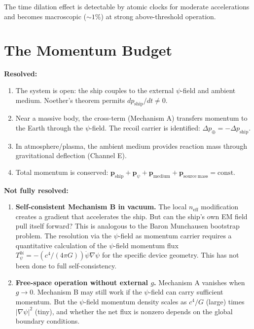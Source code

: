 \documentclass[12pt,aps,prd,superscriptaddress,nofootinbib,longbibliography]{revtex4-2}
\newcommand{\neff}{n_{\mathrm{eff}}}
\begin{document}
The time dilation effect is detectable by atomic clocks for moderate
accelerations and becomes macroscopic ($\sim 1\%$) at strong above-threshold
operation.


\section{The Momentum Budget}\label{sec:momentum}

\begin{tcolorbox}[colback=yellow!5!white, colframe=yellow!50!black,
  title=Honesty Box: What Is Resolved and What Is Not]

\textbf{Resolved:}
\begin{enumerate}
\item The system is open: the ship couples to the external $\psi$-field
and ambient medium.  Noether's theorem permits $dp_{\mathrm{ship}}/dt \neq 0$.
\item Near a massive body, the cross-term (Mechanism A) transfers momentum
to the Earth through the $\psi$-field.  The recoil carrier is identified:
$\Delta p_\oplus = -\Delta p_{\mathrm{ship}}$.
\item In atmosphere/plasma, the ambient medium provides reaction mass
through gravitational deflection (Channel E).
\item Total momentum is conserved:
$\mathbf{p}_{\mathrm{ship}} + \mathbf{p}_{\psi} + \mathbf{p}_{\mathrm{medium}}
+ \mathbf{p}_{\mathrm{source~mass}} = \mathrm{const}$.
\end{enumerate}

\textbf{Not fully resolved:}
\begin{enumerate}
\item \textbf{Self-consistent Mechanism B in vacuum.}  The local $\neff$
modification creates a gradient that accelerates the ship.  But can the
ship's own EM field pull itself forward?  This is analogous to the
Baron Munchausen bootstrap problem.  The resolution via the $\psi$-field
as momentum carrier requires a quantitative calculation of the $\psi$-field
momentum flux $T^{0i}_\psi = -(c^4/(4\pi G))\dot\psi\nabla\psi$ for
the specific device geometry.  This has not been done to full
self-consistency.

\item \textbf{Free-space operation without external $g$.}
Mechanism A vanishes when $g \to 0$.  Mechanism B may still work if the
$\psi$-field can carry sufficient momentum.  But the $\psi$-field
momentum density scales as $c^4/G$ (large) times $|\nabla\psi|^2$
(tiny), and whether the net flux is nonzero depends on the global
boundary conditions.


\end{enumerate}
\end{tcolorbox}
\end{document}
